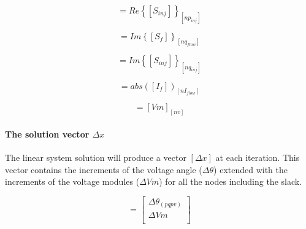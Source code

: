 \documentclass[nols,a4paper,twoside,notoc,fleqn]{tufte-book}
\begin{document}
\begin{equation}
[b3] = Re\left\{ [S_{inj}]  \right\}_{[np_{inj}]}
\end{equation}




\begin{equation}
[c3] = Im\left\{  [S_f] \right\}_{[nq_{flow}]}
\end{equation}



\begin{equation}
[d3] = Im\left\{ [S_{inj}] \right\}_{[nq_{inj}]}
\end{equation}



\begin{equation}
[e3] = abs\left([I_f]\right)_{[nI_{flow}]}
\end{equation}


\begin{equation}
[f3] = [Vm]_{[nv]}
\end{equation}



\paragraph{The solution vector $\Delta x$}

The linear system solution will produce a vector $[\Delta x]$ at each iteration. This vector contains the increments of the voltage angle ($\Delta \theta$) extended with the increments of the voltage modules ($\Delta Vm$) for all the nodes including the slack.


\begin{equation}
[\Delta x] =
\left[
\begin{array}{cc}
 \Delta \theta_{(pqpv)} \\
 \Delta Vm\\
\end{array}
\right]
\label{SE_voltage_inc}
\end{equation}
\end{document}
